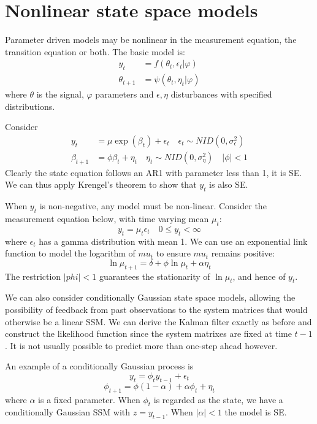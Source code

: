 \documentclass[DIV=14,titlepage=false]{scrreprt}
\begin{document}
\section{Nonlinear state space models}
Parameter driven models may be nonlinear in the measurement equation, the transition equation or both. The basic model is:
\begin{align*}
    y_t &= f(\theta_t,\epsilon_t|\varphi)\\
    \theta_{t+1} &= \psi(\theta_t,\eta_t|\varphi)
\end{align*}
where $\theta$ is the signal, $\varphi$ parameters and $\epsilon,\eta$ disturbances with specified distributions.
\begin{example}
    Consider
    \begin{align*}
        y_t &= \mu \exp(\beta_t)+\epsilon_t \quad \epsilon_t \sim NID(0,\sigma^2_\epsilon) \\
        \beta_{t+1} &= \phi \beta_{t} + \eta_t \quad \eta_t \sim NID(0,\sigma^2_\eta) \quad |\phi|<1
    \end{align*}
    Clearly the state equation follows an AR1 with parameter less than 1, it is SE. We can thus apply Krengel's theorem to show that $y_t$ is also SE.
\end{example}
\begin{example}
    When $y_t$ is non-negative, any model must be non-linear. Consider the measurement equation below, with time varying mean $\mu_t$:
    \[
        y_t = \mu_t \epsilon_t \quad 0 \leq y_t < \infty  
    \]
    where $\epsilon_t$ has a gamma distribution with mean 1. We can use an exponential link function to model the logarithm of $mu_t$ to ensure $mu_t$ remains positive:
    \[
        \ln \mu_{t+1} = \delta + \phi \ln \mu_t + \alpha \eta_t
    \]
    The restriction $|phi|<1$ guarantees the stationarity of $\ln \mu_t$, and hence of $y_t$. 
\end{example}
We can also consider conditionally Gaussian state space models, allowing the possibility of feedback from past observations to the system matrices that would otherwise be a linear SSM. We can derive the Kalman filter exactly as before and construct the likelihood function since the system matrixes are fixed at time $t-1$. It is not usually possible to predict more than one-step ahead however.
\begin{example}
    An example of a conditionally Gaussian process is
    \[
        y_t = \phi_t y_{t-1} + \epsilon_t
    \]
    \[
        \phi_{t+1} = \phi (1-\alpha)+\alpha\phi_t+\eta_t
    \]
    where $\alpha$ is a fixed parameter. When $\phi_t$ is regarded as the state, we have a conditionally Gaussian SSM with $z=y_{t-1}$. When $|\alpha|<1$ the model is SE. 
\end{example}
\end{document}
